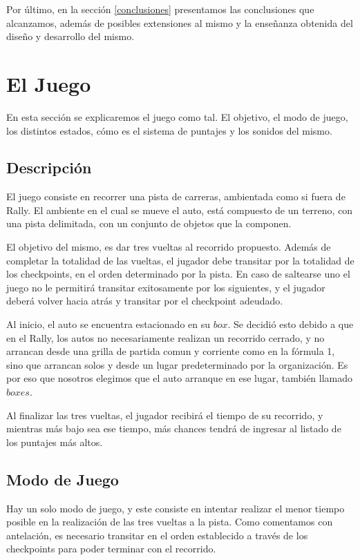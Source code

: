 \documentclass[a4paper,10pt]{article}
\begin{document}
Por \'ultimo, en la secci\'on \ref{conclusiones} presentamos las
conclusiones que alcanzamos, adem\'as de posibles
extensiones al mismo y la
ense\~nanza obtenida del dise\~no y desarrollo del mismo.

\section{El Juego}
\label{el_juego}

En esta secci\'on se explicaremos el juego como tal.  El objetivo, el
modo
de
juego, los distintos estados, c\'omo es el sistema de puntajes y los sonidos
del mismo.

\subsection{Descripci\'on}
El juego consiste en recorrer una pista de carreras, ambientada como si fuera
de Rally.  El ambiente en el cual se mueve el auto, est\'a compuesto de un
terreno, con una pista delimitada, con un conjunto de objetos que la componen.

El objetivo del mismo, es dar tres vueltas al recorrido propuesto.  Adem\'as de
completar la totalidad de las vueltas, el jugador debe transitar por la
totalidad de los checkpoints, en el orden determinado por la pista.  En caso de
saltearse uno el juego no le permitir\'a transitar exitosamente por los
siguientes, y el jugador deber\'a volver hacia atr\'as y transitar por el
checkpoint adeudado.

Al inicio, el auto se encuentra estacionado en su $box$.  Se decidi\'o esto
debido a que en el Rally, los autos no necesariamente realizan un recorrido
cerrado, y no arrancan desde una grilla de partida comun y corriente como en la
f\'ormula 1,  sino que arrancan solos y desde un lugar predeterminado por la
organizaci\'on. Es por eso que nosotros elegimos que el auto arranque en ese
lugar, tambi\'en llamado $boxes$.

Al finalizar las tres vueltas, el jugador recibir\'a el tiempo de su recorrido,
y
mientras m\'as bajo sea ese tiempo, m\'as chances tendr\'a de ingresar al
listado
de
los puntajes m\'as altos.
\subsection{Modo de Juego}
Hay un solo modo de juego, y este consiste en intentar realizar el menor tiempo
posible en la realizaci\'on de las tres vueltas a la pista.  Como comentamos
con antelaci\'on, es necesario transitar en el orden establecido a trav\'es de
los checkpoints para poder terminar con el recorrido.
\end{document}
